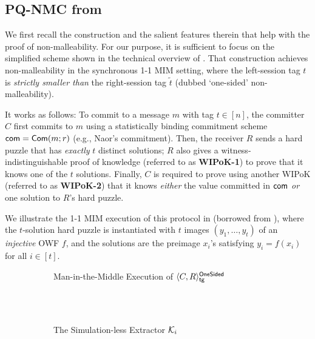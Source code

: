 \subsection{PQ-NMC from \cite{FOCS:LPY23}} 
\label{sec:overview:recall-LPY}

We first recall the \cite{FOCS:LPY23} construction and the salient features therein that help with the proof of non-malleability. For our purpose, it is sufficient to focus on the simplified scheme shown in the technical overview of \cite{FOCS:LPY23}. That construction achieves non-malleability in the synchronous 1-1 MIM setting, where the left-session tag $t$ is {\em strictly smaller than} the right-session tag $\tilde{t}$ (dubbed `one-sided' non-malleability). 

It works as follows: To commit to a message $m$ with tag $t \in [n]$, the committer $C$ first commits to $m$ using a statistically binding commitment scheme $\mathsf{com}=\mathsf{Com}(m;r)$ (e.g., Naor's commitment). Then, the receiver $R$ sends a hard puzzle that has {\em exactly} $t$ distinct solutions; $R$ also gives a witness-indistinguishable proof of knowledge (referred to as {\bf WIPoK-1}) to prove that it knows one of the $t$ solutions. Finally, $C$ is required to prove using another WIPoK (referred to as {\bf WIPoK-2}) that it knows {\em either} the value committed in $\mathsf{com}$ {\em or} one solution to $R$'s hard puzzle. 

  We illustrate the 1-1 MIM execution of this protocol in  (borrowed from \cite{FOCS:LPY23}), where the $t$-solution hard puzzle is instantiated with $t$ images $(y_1, \ldots, y_t)$ of an {\em injective} OWF $f$, and the solutions are the preimage $x_i$'s satisfying $y_i = f(x_i)$ for all $i \in [t]$.
\begin{figure}
\begin{subfigure}[h]{0.9\textwidth}
 \centering
         \caption{Man-in-the-Middle Execution of $\langle C, R\rangle^{\mathsf{OneSided}}_{\mathsf{tg}}$}
         \label{figure:one-sided:tech-overview:real}
     \end{subfigure}
     \\~

     \begin{subfigure}[h]{0.9\textwidth}
      \vspace{3em}
		\centering
         \caption{The Simulation-less Extractor $\mathcal{K}_i$}
         \label{figure:one-sided:tech-overview:Ki}
     \end{subfigure}
     \caption{}
\end{figure}

